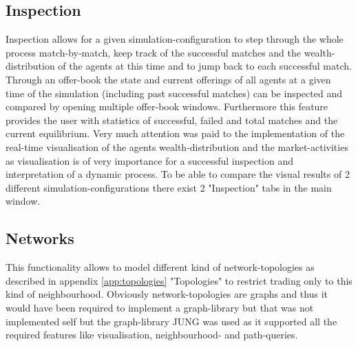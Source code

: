 \documentclass[Bachelorarbeit.tex]{subfiles}
\begin{document}
\subsection{Inspection}
Inspection allows for a given simulation-configuration to step through the whole process match-by-match, keep track of the successful matches and the wealth-distribution of the agents at this time and to jump back to each successful match. Through an offer-book the state and current offerings of all agents at a given time of the simulation (including past successful matches) can be inspected and compared by opening multiple offer-book windows. Furthermore this feature provides the user with statistics of successful, failed and total matches and the current equilibrium. Very much attention was paid to the implementation of the real-time visualisation of the agents wealth-distribution and the market-activities as visualisation is of very importance for a successful inspection and interpretation of a dynamic process. To be able to compare the visual results of 2 different simulation-configurations there exist 2 "Inspection" tabs in the main window.

\subsection{Networks}
This functionality allows to model different kind of network-topologies as described in appendix \ref{app:topologies} "Topologies" to restrict trading only to this kind of neighbourhood. Obviously network-topologies are graphs and thus it would have been required to implement a graph-library but that was not implemented self but the graph-library JUNG was used as it supported all the required features like visualisation, neighbourhood- and path-queries.
\end{document}
